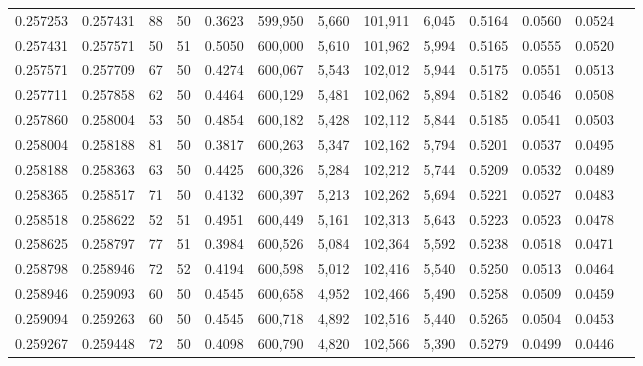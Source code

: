 \begin{tabular}{rrrrrrrrrrrrr}
0.257253 & 0.257431 &    88 &  50 &                                     0.3623 & 599,950 &   5,660 & 101,911 &   6,045 & 0.5164 & 0.0560 & 0.0524 \\
0.257431 & 0.257571 &    50 &  51 &                                     0.5050 & 600,000 &   5,610 & 101,962 &   5,994 & 0.5165 & 0.0555 & 0.0520 \\
0.257571 & 0.257709 &    67 &  50 &                                     0.4274 & 600,067 &   5,543 & 102,012 &   5,944 & 0.5175 & 0.0551 & 0.0513 \\
0.257711 & 0.257858 &    62 &  50 &                                     0.4464 & 600,129 &   5,481 & 102,062 &   5,894 & 0.5182 & 0.0546 & 0.0508 \\
0.257860 & 0.258004 &    53 &  50 &                                     0.4854 & 600,182 &   5,428 & 102,112 &   5,844 & 0.5185 & 0.0541 & 0.0503 \\
0.258004 & 0.258188 &    81 &  50 &                                     0.3817 & 600,263 &   5,347 & 102,162 &   5,794 & 0.5201 & 0.0537 & 0.0495 \\
0.258188 & 0.258363 &    63 &  50 &                                     0.4425 & 600,326 &   5,284 & 102,212 &   5,744 & 0.5209 & 0.0532 & 0.0489 \\
0.258365 & 0.258517 &    71 &  50 &                                     0.4132 & 600,397 &   5,213 & 102,262 &   5,694 & 0.5221 & 0.0527 & 0.0483 \\
0.258518 & 0.258622 &    52 &  51 &                                     0.4951 & 600,449 &   5,161 & 102,313 &   5,643 & 0.5223 & 0.0523 & 0.0478 \\
0.258625 & 0.258797 &    77 &  51 &                                     0.3984 & 600,526 &   5,084 & 102,364 &   5,592 & 0.5238 & 0.0518 & 0.0471 \\
0.258798 & 0.258946 &    72 &  52 &                                     0.4194 & 600,598 &   5,012 & 102,416 &   5,540 & 0.5250 & 0.0513 & 0.0464 \\
0.258946 & 0.259093 &    60 &  50 &                                     0.4545 & 600,658 &   4,952 & 102,466 &   5,490 & 0.5258 & 0.0509 & 0.0459 \\
0.259094 & 0.259263 &    60 &  50 &                                     0.4545 & 600,718 &   4,892 & 102,516 &   5,440 & 0.5265 & 0.0504 & 0.0453 \\
0.259267 & 0.259448 &    72 &  50 &                                     0.4098 & 600,790 &   4,820 & 102,566 &   5,390 & 0.5279 & 0.0499 & 0.0446 \\

\end{tabular}
